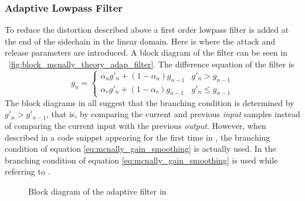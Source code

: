 \documentclass[../main2.tex]{subfiles}
\providecommand{\rootdir}{..}
\begin{document}
\subsubsection{Adaptive Lowpass Filter}
To reduce the distortion described above a first order lowpass filter is added at the end of the sidechain in the linear domain. Here is where the attack and release parameters are introduced. A block diagram of the filter can be seen in ~\ref{fig:block_mcnally_theory_adap_filter}. The difference equation of the filter is
\begin{equation}
g_n = \begin{cases}
    \alpha_{a} g'_n + (1-\alpha_{a}) g_{n-1} 	& g'_n > g_{n-1} \\
    \alpha_{r} g'_n + (1-\alpha_{r}) g_{n-1} 	& g'_n \leq g_{n-1}
\end{cases}
\label{eq:mcnally_gain_smoothing}
\end{equation}
The block diagrams in \cite{mcnally1984dynamic}\cite{dafx02}\cite{dagx11}\cite{zolzer1997digital}\cite{zolzer1997digital}\cite{zolzer2008digital} all suggest that the branching condition is determined by $g'_n > g'_{n-1}$, that is, by comparing the current and previous \emph{input} samples instead of comparing the current input with the previous \emph{output}. However, when described in a code snippet appearing for the first time in \cite{dafx11}, the branching condition of equation \eqref{eq:mcnally_gain_smoothing} is actually used. In \cite{bitzer2006parameter} the branching condition of equation \eqref{eq:mcnally_gain_smoothing} is used while referring to \cite{mcnally1984dynamic}\cite{dafx02}.
\begin{figure}
\centerline{}
\caption{Block diagram of the adaptive filter in \cite{mcnally1984dynamic}}
\label{fig:block_mcnally_theory_rms}
\end{figure}
\end{document}
